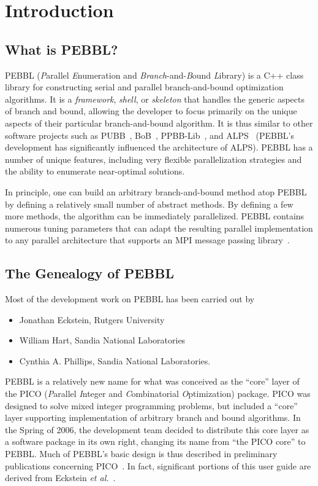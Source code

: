 \section{Introduction}


\subsection{What is PEBBL?}

PEBBL (\emph{P}arallel \emph{E}numeration and
\emph{Branch}-and-\emph{B}ound \emph{L}ibrary) is a C++ class library
for constructing serial and parallel branch-and-bound optimization
algorithms.  It is a \emph{framework}, \emph{shell}, or
\emph{skeleton} that handles the generic aspects of branch and bound,
allowing the developer to focus primarily on the unique aspects of
their particular branch-and-bound algorithm.  
It is thus similar to other software projects such
as PUBB~\cite{SHH95,SHH97}, BoB~\cite{bob95}, PPBB-Lib~\cite{PPBB96},
and ALPS~\cite{RLS04} (PEBBL's development has significantly
influenced the architecture of ALPS).  PEBBL has a number of unique
features, including very flexible parallelization strategies and the
ability to enumerate near-optimal solutions.

In principle, one can build an arbitrary branch-and-bound method atop
PEBBL by defining a relatively small number of abstract methods.  By
defining a few more methods, the algorithm can be immediately
parallelized.  PEBBL contains numerous tuning parameters that can
adapt the resulting parallel implementation to any parallel
architecture that supports an MPI message passing
library~\cite{SOHWD96}.


\subsection{The Genealogy of PEBBL}

Most of the development work on PEBBL has been carried out by
\begin{itemize}
\item Jonathan Eckstein, Rutgers University
\item William Hart, Sandia National Laboratories
\item Cynthia A. Phillips, Sandia National Laboratories.
\end{itemize}
PEBBL is a relatively new name for what was conceived as the ``core''
layer of the PICO (\emph{P}arallel \emph{I}nteger and
\emph{C}ombinatorial \emph{O}ptimization) package.  PICO was designed
to solve mixed integer programming problems, but included a ``core''
layer supporting implementation of arbitrary branch and bound
algorithms.  In the Spring of 2006, the development team decided to
distribute this core layer as a software package in its own right,
changing its name from ``the PICO core'' to PEBBL.  Much of PEBBL's
basic design is thus described in preliminary
publications concerning PICO~\cite{EHP97,EPH00,EPH00a}.  In fact,
significant portions of this user guide are derived
from Eckstein \emph{et al.}~\cite{EPH00a,EPH00}.

